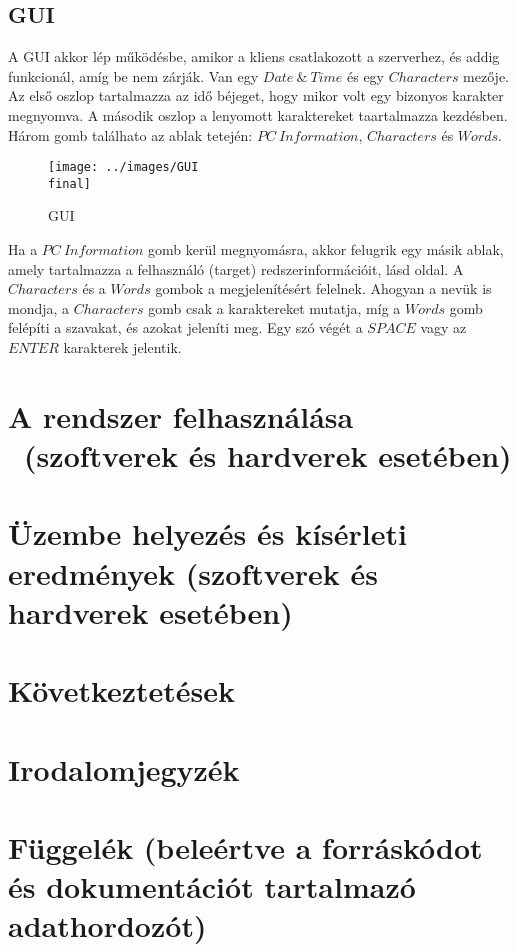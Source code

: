 \documentclass[a4paper, 11pt]{article}
\begin{document}
\subsection{GUI}\label{subsec:gui}
A GUI akkor lép működésbe, amikor a kliens csatlakozott a szerverhez, és addig funkcionál, amíg be nem zárják. Van egy $Date\ \&\ Time$ és egy $Characters$ mezője. Az első oszlop tartalmazza az idő béjeget, hogy mikor volt egy bizonyos karakter megnyomva. A második oszlop a lenyomott karaktereket taartalmazza kezdésben. Három gomb találhato az ablak tetején: $PC\ Information$, $Characters$ és $Words$.
\begin{figure}[H]
\centering
\texttt{[image: ../images/GUI\\ final]}
\caption{GUI}
\label{fig:gui}
\end{figure}
Ha a $PC\ Information$ gomb kerül megnyomásra, akkor felugrik egy másik ablak, amely tartalmazza a felhasználó (target) redszerinformációit, lásd \pageref{subsubsec:keyloggerclientclass} oldal. A $Characters$ és a $Words$ gombok a megjelenítésért felelnek. Ahogyan a nevük is mondja, a $Characters$ gomb csak a karaktereket mutatja, míg a $Words$ gomb felépíti a szavakat, és azokat jeleníti meg. Egy szó végét a $SPACE$ vagy az $ENTER$ karakterek jelentik.

\section{A rendszer felhasználása \ (szoftverek és hardverek esetében)}\label{sec:useage}

\section{Üzembe helyezés és kísérleti eredmények (szoftverek és hardverek esetében)}\label{sec:testcases}

\section{Következtetések}\label{sec:conc}

\section{Irodalomjegyzék}\label{sec:irod}
%
\printbibliography[title={\ }]

\section{Függelék (beleértve a forráskódot és dokumentációt tartalmazó adathordozót)}\label{sec:dep}
\end{document}
